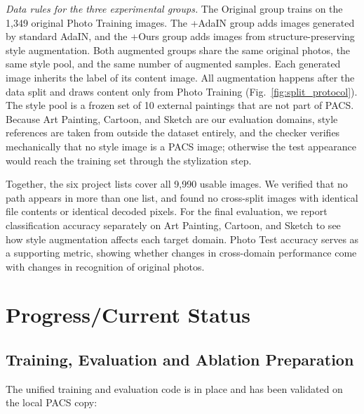 \documentclass[conference]{IEEEtran}
\begin{document}
\textit{Data rules for the three experimental groups.} The Original group trains on the 1,349 original Photo Training images. The +AdaIN group adds images generated by standard AdaIN, and the +Ours group adds images from structure-preserving style augmentation. Both augmented groups share the same original photos, the same style pool, and the same number of augmented samples. Each generated image inherits the label of its content image. All augmentation happens after the data split and draws content only from Photo Training (Fig.~\ref{fig:split_protocol}). The style pool is a frozen set of 10 external paintings that are not part of PACS. Because Art Painting, Cartoon, and Sketch are our evaluation domains, style references are taken from outside the dataset entirely, and the checker verifies mechanically that no style image is a PACS image; otherwise the test appearance would reach the training set through the stylization step.

Together, the six project lists cover all 9,990 usable images. We verified that no path appears in more than one list, and found no cross-split images with identical file contents or identical decoded pixels. For the final evaluation, we report classification accuracy separately on Art Painting, Cartoon, and Sketch to see how style augmentation affects each target domain. Photo Test accuracy serves as a supporting metric, showing whether changes in cross-domain performance come with changes in recognition of original photos.




\section{Progress/Current Status}



\subsection{Training, Evaluation and Ablation Preparation}
\label{sec:training_prep}

The unified training and evaluation code is in place and has been validated on the local PACS copy:
\end{document}
